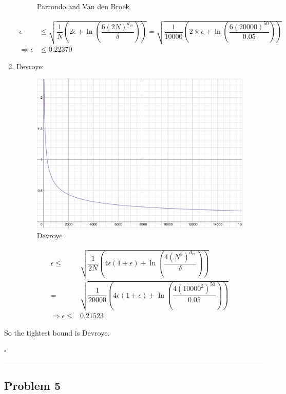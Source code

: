\documentclass[12pt]{article}
\newcommand*{\QEDB}{\hfill\ensuremath{\square}}
\newcommand{\ParTh}[1]{\left(#1\right)}
\newcommand{\horrule}[1]{\rule{\linewidth}{#1}}
\begin{document}
\begin{enumerate}
\begin{figure}[h]
	\caption{Parrondo and Van den Broek}
	\label{4-4}
\end{figure}
\begin{align}
\epsilon&\leq\sqrt{\dfrac{1}{N}\ParTh{2\epsilon+\ln\ParTh{\dfrac{6\ParTh{2N}^{d_{\text{vc}}}}{\delta}}}}=\sqrt{\dfrac{1}{10000}\ParTh{2\times\epsilon+\ln\ParTh{\dfrac{6\ParTh{20000}^{50}}{0.05}}}}\\
\Rightarrow\epsilon&\leq0.22370
\end{align}
\item Devroye:
\begin{figure}[h]
	\centering
	\includegraphics[scale=0.4]{D.png}
	\caption{Devroye}
	\label{4-5}
\end{figure}
\begin{align}
\epsilon\leq&\sqrt{\dfrac{1}{2N}\ParTh{4\epsilon\ParTh{1+\epsilon}+\ln\ParTh{\dfrac{4\ParTh{N^2}^{d_{\text{vc}}}}{\delta}}}}\\=&\sqrt{\dfrac{1}{20000}\ParTh{4\epsilon\ParTh{1+\epsilon}+\ln\ParTh{\dfrac{4\ParTh{{10000}^2}^{50}}{0.05}}}}\\
\Rightarrow\epsilon\leq&0.21523
\end{align}
\end{enumerate}
So the tightest bound is Devroye.

\QEDB

\horrule{0.5pt}

\subsection*{Problem 5}
\end{document}
